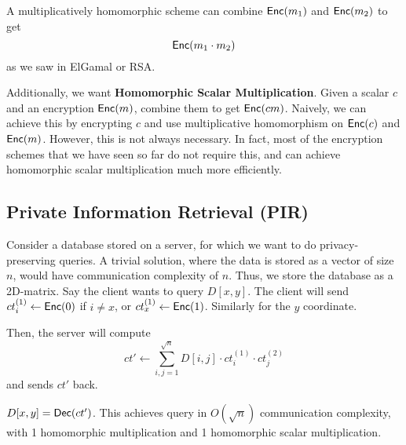 A multiplicatively homomorphic scheme can combine $\operatorname{\mathsf{Enc}}(m_1)$ and $\operatorname{\mathsf{Enc}}(m_2)$ to get
\[\operatorname{\mathsf{Enc}}(m_1 \cdot m_2)\]
as we saw in ElGamal or RSA.

Additionally, we want \textbf{Homomorphic Scalar Multiplication}. Given a scalar $c$ and an encryption $\operatorname{\mathsf{Enc}}(m)$, combine them to get $\operatorname{\mathsf{Enc}}(cm)$. Naively, we can achieve this by encrypting $c$ and use multiplicative homomorphism on $\operatorname{\mathsf{Enc}}(c)$ and $\operatorname{\mathsf{Enc}}(m)$. However, this is not always necessary. In fact, most of the encryption schemes that we have seen so far do not require this, and can achieve homomorphic scalar multiplication much more efficiently.

\subsection{Private Information Retrieval (PIR)}

Consider a database stored on a server, for which we want to do privacy-preserving queries. A trivial solution, where the data is stored as a vector of size $n$, would have communication complexity of $n$. Thus, we store the database as a 2D-matrix. Say the client wants to query $D[x,y]$. The client will send $ct_i^{(1)}\leftarrow \operatorname{\mathsf{Enc}}(0)$ if $i\neq x$, or $ct_x^{(1)}\leftarrow \operatorname{\mathsf{Enc}}(1)$. Similarly for the $y$ coordinate.

Then, the server will compute
\[ct'\leftarrow \sum^{\sqrt{n}}_{i,j=1}D[i,j]\cdot ct_i^{(1)}\cdot ct_j^{(2)}\]
and sends $ct'$ back.

$D[x,y] = \operatorname{\mathsf{Dec}}(ct')$. This achieves query in $O(\sqrt{n})$ communication complexity, with 1 homomorphic multiplication and 1 homomorphic scalar multiplication.

\begin{center}
    \def\svgwidth{0.2\columnwidth}
    
\end{center}

